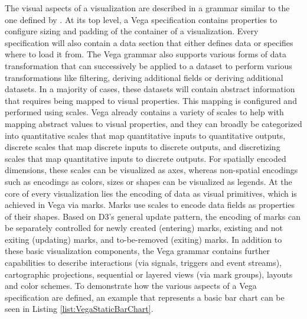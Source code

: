 The visual aspects of a visualization are described in a grammar similar to the one defined by \cite{GrammarOfGraphics}. 
At its top level, a Vega specification contains properties to configure sizing and padding of the container of a visualization. 
Every specification will also contain a data section that either defines data or specifies where to load it from. 
The Vega grammar also supports various forms of data transformation that can successively be applied to a dataset to perform various transformations like filtering, deriving additional fields or deriving additional datasets.
In a majority of cases, these datasets will contain abstract information that requires being mapped to visual properties.
This mapping is configured and performed using scales. 
Vega already contains a variety of scales to help with mapping abstract values to visual properties, and they can broadly be categorized into quantitative scales that map quantitative inputs to quantitative outputs, discrete scales that map discrete inputs to discrete outputs, and discretizing scales that map quantitative inputs to discrete outputs.
For spatially encoded dimensions, these scales can be visualized as axes, whereas non-spatial encodings such as encodings as colors, sizes or shapes can be visualized as legends.
At the core of every visualization lies the encoding of data as visual primitives, which is achieved in Vega via marks.
Marks use scales to encode data fields as properties of their shapes.
Based on D3's general update pattern, the encoding of marks can be separately controlled for newly created (entering) marks, existing and not exiting (updating) marks, and to-be-removed (exiting) marks.  
In addition to these basic visualization components, the Vega grammar contains further capabilities to describe interactions (via signals, triggers and event streams), cartographic projections, sequential or layered views (via mark groups), layouts and color schemes. 
To demonstrate how the various aspects of a Vega specification are defined, an example that represents a basic bar chart can be seen in Listing \ref{list:VegaStaticBarChart}.

\begin{samepage}
 Vega specification of a static bar chart. 
    Demonstrates the principle of data, scales, axes and marks.
  },
]{listings/vega-static-bar-chart.json}
\end{samepage}

